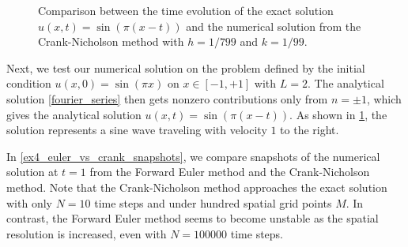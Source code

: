 \begin{figure}[b]
\centering
{}
\caption{\label{sine_evolution}Comparison between the time evolution of the exact solution $u(x,t)=\sin(\pi(x-t))$ and the numerical solution from the Crank-Nicholson method with $h=1/799$ and $k=1/99$.}
\end{figure}

Next, we test our numerical solution on the problem defined by the initial condition $u(x, 0) = \sin(\pi x)$ on $x \in [-1, +1]$ with $L = 2$.
The analytical solution \ref{fourier_series} then gets nonzero contributions only from $n = \pm 1$, which gives the analytical solution $u(x, t) = \sin(\pi(x-t))$.
As shown in \cref{sine_evolution}, the solution represents a sine wave traveling with velocity $1$ to the right.

In \cref{ex4_euler_vs_crank_snapshots}, we compare snapshots of the numerical solution at $t = 1$ from the Forward Euler method and the Crank-Nicholson method.
Note that the Crank-Nicholson method approaches the exact solution with only $N=10$ time steps and under hundred spatial grid points $M$.
In contrast, the Forward Euler method seems to become unstable as the spatial resolution is increased, even with $N=100000$ time steps.

